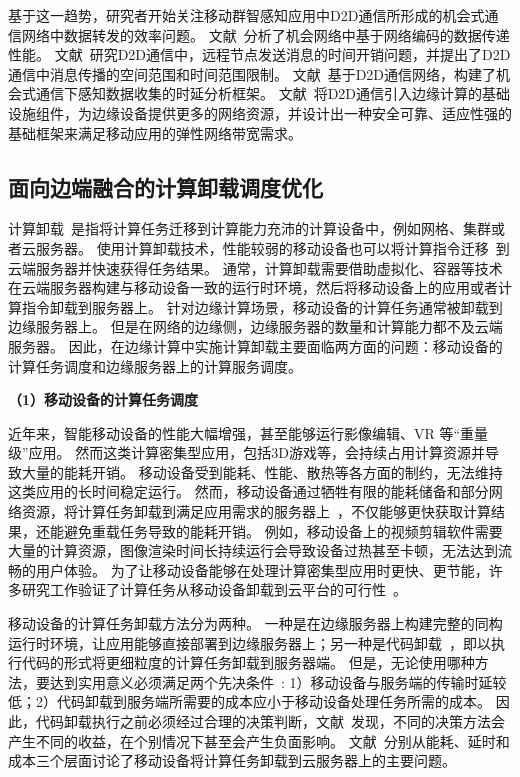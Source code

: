 基于这一趋势，研究者开始关注移动群智感知应用中D2D通信所形成的机会式通信网络中数据转发的效率问题。
文献~分析了机会网络中基于网络编码的数据传递性能。
文献~研究D2D通信中，远程节点发送消息的时间开销问题，并提出了D2D通信中消息传播的空间范围和时间范围限制。
文献~基于D2D通信网络，构建了机会式通信下感知数据收集的时延分析框架。
文献~将D2D通信引入边缘计算的基础设施组件，为边缘设备提供更多的网络资源，并设计出一种安全可靠、适应性强的基础框架来满足移动应用的弹性网络带宽需求。

\subsection{面向边端融合的计算卸载调度优化}

计算卸载~\cite{DBLP:journals/network/MaZZWP13}是指将计算任务迁移到计算能力充沛的计算设备中，例如网格、集群或者云服务器。
使用计算卸载技术，性能较弱的移动设备也可以将计算指令迁移~\cite{DBLP:journals/monet/KumarLLB13}到云端服务器并快速获得任务结果。
通常，计算卸载需要借助虚拟化、容器等技术在云端服务器构建与移动设备一致的运行时环境，然后将移动设备上的应用或者计算指令卸载到服务器上。
针对边缘计算场景，移动设备的计算任务通常被卸载到边缘服务器上。
但是在网络的边缘侧，边缘服务器的数量和计算能力都不及云端服务器。
因此，在边缘计算中实施计算卸载主要面临两方面的问题：移动设备的计算任务调度和边缘服务器上的计算服务调度。

\textbf{（1）移动设备的计算任务调度}

近年来，智能移动设备的性能大幅增强，甚至能够运行影像编辑、VR 等“重量级”应用。
然而这类计算密集型应用，包括3D游戏等，会持续占用计算资源并导致大量的能耗开销。
移动设备受到能耗、性能、散热等各方面的制约，无法维持这类应用的长时间稳定运行。
然而，移动设备通过牺牲有限的能耗储备和部分网络资源，将计算任务卸载到满足应用需求的服务器上~\cite{DBLP:conf/ispa/KovachevYK12}，不仅能够更快获取计算结果，还能避免重载任务导致的能耗开销。
例如，移动设备上的视频剪辑软件需要大量的计算资源，图像渲染时间长持续运行会导致设备过热甚至卡顿，无法达到流畅的用户体验。
为了让移动设备能够在处理计算密集型应用时更快、更节能，许多研究工作验证了计算任务从移动设备卸载到云平台的可行性~\cite{DBLP:conf/secon/HassanXWC15,DBLP:journals/pervasive/SatyanarayananBCD09,DBLP:journals/computer/KumarL10}。

移动设备的计算任务卸载方法分为两种。
一种是在边缘服务器上构建完整的同构运行时环境，让应用能够直接部署到边缘服务器上；另一种是代码卸载~\cite{DBLP:conf/mobisys/CuervoBCWSCB10}，即以执行代码的形式将更细粒度的计算任务卸载到服务器端。
但是，无论使用哪种方法，要达到实用意义必须满足两个先决条件~\cite{Flores:2017bv}: 1）移动设备与服务端的传输时延较低；2）代码卸载到服务端所需要的成本应小于移动设备处理任务所需的成本。
因此，代码卸载执行之前必须经过合理的决策判断，文献~发现，不同的决策方法会产生不同的收益，在个别情况下甚至会产生负面影响。
文献~分别从能耗、延时和成本三个层面讨论了移动设备将计算任务卸载到云服务器上的主要问题。

